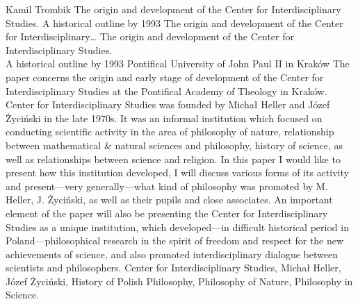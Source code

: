 \begin{artengenv}{Kamil Trombik}
	{The origin and development of the Center for Interdisciplinary Studies. A historical outline by 1993}
	{The origin and development of the Center for Interdisciplinary\ldots}
	{The origin and development of the Center for Interdisciplinary Studies.\\A historical outline by 1993}
	{Pontifical University of John Paul II in Kraków\label{trombik-start}}
	{The paper concerns the origin and early stage of development of the Center for Interdisciplinary Studies at the
		Pontifical Academy of Theology in Kraków. Center for Interdisciplinary Studies was founded by Michał Heller and Józef
		Życiński in the late 1970s. It was an informal institution which focused on conducting scientific activity in the area
		of philosophy of nature, relationship between mathematical \& natural sciences and philosophy, history of science, as
		well as relationships between science and religion. In this paper I would like to present how this institution
		developed, I will discuss various forms of its activity and present---very generally---what kind of philosophy was promoted
		by M. Heller, J. Życiński, as well as their pupils and close associates. An important element of the paper will also be
		presenting the Center for Interdisciplinary Studies as a unique institution, which developed---in difficult historical
		period in Poland---philosophical research in the spirit of freedom and respect for the new achievements of science, and
		also promoted interdisciplinary dialogue between scientists and philosophers.}
	{Center for Interdisciplinary Studies, Michał Heller, Józef Życiński, History of Polish Philosophy, Philosophy of Nature, Philosophy in Science.}





\end{artengenv}
